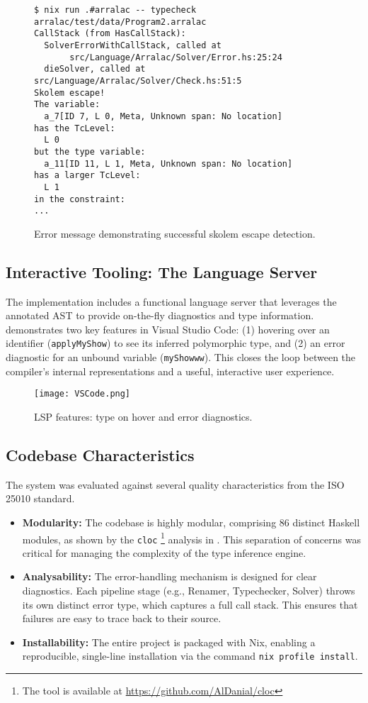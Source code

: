 \begin{figure}[h]
    \centering
    \begin{verbatim}
$ nix run .#arralac -- typecheck arralac/test/data/Program2.arralac
CallStack (from HasCallStack):
  SolverErrorWithCallStack, called at
       src/Language/Arralac/Solver/Error.hs:25:24
  dieSolver, called at src/Language/Arralac/Solver/Check.hs:51:5
Skolem escape!
The variable:
  a_7[ID 7, L 0, Meta, Unknown span: No location]
has the TcLevel:
  L 0
but the type variable:
  a_11[ID 11, L 1, Meta, Unknown span: No location]
has a larger TcLevel:
  L 1
in the constraint:
...
\end{verbatim}
    \caption{Error message demonstrating successful skolem escape detection.}
    \label{fig:skolem-escape-error}
\end{figure}

\subsection{Interactive Tooling: The Language Server}
The implementation includes a functional language server that leverages the annotated AST to provide on-the-fly diagnostics and type information.  demonstrates two key features in Visual Studio Code: (1) hovering over an identifier (\texttt{applyMyShow}) to see its inferred polymorphic type, and (2) an error diagnostic for an unbound variable (\texttt{myShowww}). This closes the loop between the compiler's internal representations and a useful, interactive user experience.

\begin{figure}[h!]
    \centering
    \texttt{[image: VSCode.png]}
    \caption{LSP features: type on hover and error diagnostics.}
    \label{fig:lsp-demo}
\end{figure}

\subsection{Codebase Characteristics}
The system was evaluated against several quality characteristics from the ISO 25010 standard.
\begin{itemize}
    \item \textbf{Modularity:} The codebase is highly modular, comprising 86 distinct Haskell modules, as shown by the \texttt{cloc} \footnote{The tool is available at \url{https://github.com/AlDanial/cloc}} analysis in . This separation of concerns was critical for managing the complexity of the type inference engine.
    \item \textbf{Analysability:} The error-handling mechanism is designed for clear diagnostics. Each pipeline stage (e.g., Renamer, Typechecker, Solver) throws its own distinct error type, which captures a full call stack. This ensures that failures are easy to trace back to their source.
    \item \textbf{Installability:} The entire project is packaged with Nix, enabling a reproducible, single-line installation via the command \texttt{nix profile install}.
\end{itemize}

